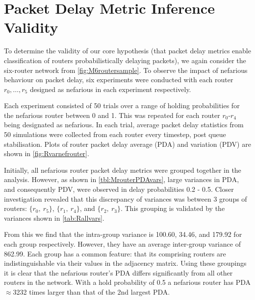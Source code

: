 \section{Packet Delay Metric Inference Validity}
\label{sec:MPDMinferencevalid}
To determine the validity of our core hypothesis (that packet delay metrics enable classification of routers probabilistically delaying packets), we again consider the six-router network from \cref{fig:M6routersample}. To observe the impact of nefarious behaviour on packet delay, six experiments were conducted with each router $r_0,\dots, r_5$ designed as nefarious in each experiment respectively.\par
Each experiment consisted of 50 trials over a range of holding probabilities for the nefarious router between 0 and 1. This was repeated for each router $r_0$-$r_4$ being designated as nefarious. In each trial, average packet delay statistics from 50 simulations were collected from each router every timestep, post queue stabilisation. Plots of router packet delay average (PDA) and variation (PDV) are shown in \cref{fig:Rvarnefrouter}.\par
Initially, all nefarious router packet delay metrics were grouped together in the analysis. However, as shown in \cref{tbl:MrouterPDAvars}, large variances in PDA, and consequently PDV, were observed in delay probabilities 0.2 - 0.5. Closer investigation revealed that this discrepancy of variances was between 3 groups of routers: $\{r_0,\ r_5\}$, $\{r_1,\ r_4\}$, and $\{r_2,\ r_3\}$. This grouping is validated by the variances shown in \cref{tab:Rallvars}.\par
From this we find that the intra-group variance is 100.60, 34.46, and 179.92 for each group respectively. However, they have an average inter-group variance of 862.99. Each group has a common feature: that its comprising routers are indistinguishable via their values in the adjacency matrix. Using these groupings it is clear that the nefarious router's PDA differs significantly from all other routers in the network. With a hold probability of 0.5 a nefarious router has PDA $\approx$3232 times larger than that of the 2nd largest PDA.\par
